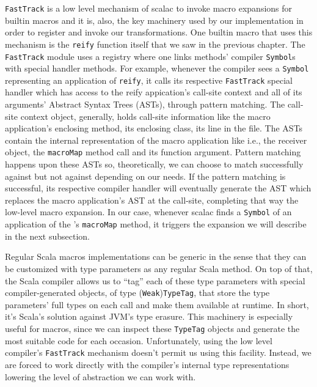 \texttt{FastTrack} is a low level mechanism of scalac to invoke macro
expansions for builtin macros and it is, also, the key machinery used by our
implementation in order to register and invoke our transformations. One builtin
macro that uses this mechanism is the \texttt{reify} function itself that we saw in the
previous chapter. The \texttt{FastTrack} module uses a registry where one links
methods' compiler \texttt{Symbol}s with special handler methods. For example, whenever
the compiler sees a \texttt{Symbol} representing an application of \texttt{reify}, it calls its
respective \texttt{FastTrack} special handler which has access to the reify appication's
call-site context and all of  its arguments' Abstract Syntax Trees (ASTs),
through pattern matching. The call-site context object, generally, holds
call-site information like the macro application's enclosing method, its
enclosing class, its line in the file. The ASTs contain the internal
representation of the macro application like 
i.e., the receiver object, the \texttt{macroMap} method call and its function argument.
Pattern matching happens upon these ASTs so, theoretically, we can choose to
match successfully against  but not against  depending on our needs. If the pattern
matching is successful, its respective compiler handler will eventually generate
the AST which replaces the macro application's AST at the call-site, completing
that way the low-level macro expansion. In our case, whenever scalac finds a
\texttt{Symbol} of an application of the 's
\texttt{macroMap} method, it triggers the expansion we will describe in the next
subsection.

Regular Scala macros implementations can be generic in the sense that they can
be customized with type parameters as any regular Scala method. On top of that,
the Scala compiler allows us to ``tag'' each of these type parameters with
special compiler-generated objects, of type (\texttt{Weak})\texttt{TypeTag}, that store the
type parameters' full types on each call and make them available at runtime. In
short, it's Scala's solution against JVM's type erasure. This machinery is
especially useful for macros, since we can inspect these \texttt{TypeTag} objects and
generate the most suitable code for each occasion. Unfortunately, using the low
level compiler's \texttt{FastTrack} mechanism doesn't permit us using this facility.
Instead, we are forced to work directly with the compiler's internal type
representations lowering the level of abstraction we can work with.

